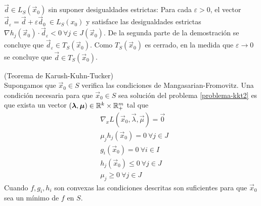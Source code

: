 \begin{demostracion}
$\vec{d}\in L_S(\vec{x}_0)$ sin suponer desigualdades estrictas: Para cada $\varepsilon > 0$, el vector $\vec{d}_\varepsilon = \vec{d} + \varepsilon \vec{d}_0 \:\in L_S(x_0)$ y satisface las desigualdades estrictas $\nabla h_j(\vec{x}_0)\cdot \vec{d}_\varepsilon < 0 \:\forall j\in J(\vec{x}_0)$. De la segunda parte de la demostraci\'on se concluye que $\vec{d}_\varepsilon \in T_S(\vec{x}_0)$. Como $T_S(\vec{x}_0)$ es cerrado, en la medida que $\varepsilon \to 0$ se concluye que $\vec{d} \in T_S(\vec{x}_0)$.
\end{demostracion}

\begin{teorema}{\rm (Teorema de Karush-Kuhn-Tucker)}\label{teo-kkt-2}
\\Supongamos que $\vec{x}_0 \in S$ verifica las condiciones de Mangasarian-Fromovitz. Una condici\'on necesaria para que $\vec{x}_0 \in S$ sea soluci\'on del problema \ref{problema-kkt2} es que exista un vector $(\boldsymbol{\lambda},\boldsymbol{\mu})\in \mathbb{R}^{k}\times \mathbb{R}^m_+$ tal que
\begin{align}
&\nabla_x L (\vec{x}_0,\vec{\lambda},\vec{\mu}) = \vec{0} \\
&\mu_j h_j (\vec{x}_0) = 0 \: \forall j\in J \\
&g_i(\vec{x}_0) = 0 \: \forall i\in I \\
&h_j(\vec{x}_0) \leq 0 \: \forall j\in J  \\
&\mu_j \geq 0 \: \forall j\in J
\end{align}
Cuando $f,g_i,h_i$ son convexas las condiciones descritas son suficientes para que $\vec{x}_0$ sea un m\'inimo de $f$ en $S$.
\end{teorema}

